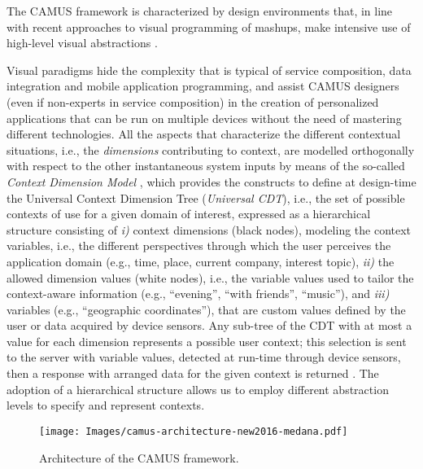 \label{sec:platform}
The CAMUS framework is characterized by design environments that, in line with recent approaches to visual programming of mashups, make intensive use of high-level visual abstractions \cite{DBLP:journals/vlc/ArditoCDLMPP14}.

Visual paradigms hide the complexity that is typical of service composition, data integration and mobile application programming, and assist CAMUS designers (even if non-experts in service composition) in the creation of personalized applications that can be run on multiple devices without the need of mastering different technologies.
All the aspects that characterize the different contextual situations, i.e.,
the \emph{dimensions} contributing to context,
are modelled  orthogonally with respect to the other instantaneous system inputs by means of the so-called \emph{Context Dimension Model} \cite{DBLP:journals/cacm/BolchiniCOQRST09,DBLP:journals/debu/BolchiniOQST11}, which provides the constructs to define at design-time
the Universal Context Dimension Tree (\emph{Universal CDT}), i.e., the set of possible contexts of use for a given domain of interest, expressed as a hierarchical structure consisting
of \emph{i)} context dimensions (black nodes), modeling the context variables,
i.e., the different perspectives through which the user perceives the application domain
(e.g., time, place, current company, interest topic), \emph{ii)} the allowed dimension values
(white nodes), i.e., the variable values used to tailor the context-aware information (e.g., ``evening'', ``with friends'', ``music''), and \emph{iii)} variables (e.g., ``geographic coordinates''), that are custom values defined by the user or data acquired by device sensors. Any sub-tree of the CDT with at most a value for each dimension represents a possible user context; this selection is sent to the server with variable values, detected at run-time through device sensors, then a response with arranged data for the given context is returned .
The adoption of a hierarchical
structure allows us to employ different abstraction levels to specify and represent contexts.

%
\begin{figure} [ht]
\centering
\texttt{[image: Images/camus-architecture-new2016-medana.pdf]}
\caption{Architecture of the CAMUS framework.}
\label{fig:architecture}
\end{figure}
%

